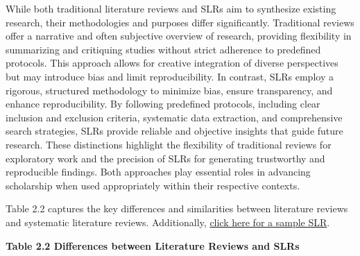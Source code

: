 \documentclass[
  letterpaper,
  DIV=11,
  numbers=noendperiod]{scrreprt}
\begin{document}
While both traditional literature reviews and SLRs aim to synthesize
existing research, their methodologies and purposes differ
significantly. Traditional reviews offer a narrative and often
subjective overview of research, providing flexibility in summarizing
and critiquing studies without strict adherence to predefined protocols.
This approach allows for creative integration of diverse perspectives
but may introduce bias and limit reproducibility. In contrast, SLRs
employ a rigorous, structured methodology to minimize bias, ensure
transparency, and enhance reproducibility. By following predefined
protocols, including clear inclusion and exclusion criteria, systematic
data extraction, and comprehensive search strategies, SLRs provide
reliable and objective insights that guide future research. These
distinctions highlight the flexibility of traditional reviews for
exploratory work and the precision of SLRs for generating trustworthy
and reproducible findings. Both approaches play essential roles in
advancing scholarship when used appropriately within their respective
contexts.

Table 2.2 captures the key differences and similarities between
literature reviews and systematic literature reviews. Additionally,
\href{https://mytwu-my.sharepoint.com/personal/jodi_mcbride_twu_ca/Documents/Documents/697/A\%20Systematic\%20Literature\%20Review\%20of\%20Servant\%20Leadership\%20Theory\%20in\%20Organizational\%20Contexts.pdf}{click
here for a sample SLR}.

\textbf{Table 2.2 Differences between Literature Reviews and SLRs}
\end{document}

